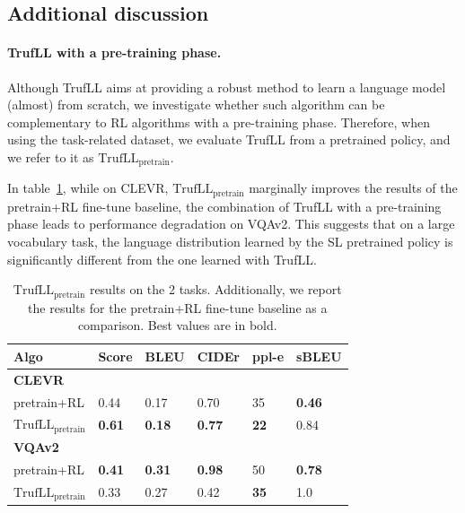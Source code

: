 \documentclass{article}
\newcommand{\algo}{TrufLL\xspace}
\begin{document}
\subsection{Additional discussion}
\label{app:subsec:discussion}
\paragraph{\algo with a pre-training phase.}
\label{sec:app:pretrain}
Although \algo aims at providing a robust method to learn a language model (almost) from scratch, we investigate whether such algorithm can be complementary to RL algorithms with a pre-training phase. Therefore, when using the task-related dataset, we evaluate \algo from a pretrained policy, and we refer to it as $\mathrm{\algo}_{\mathrm{pretrain}}$.  

In table~\ref{table:abl:truffl_pretrain}, while on CLEVR, $\mathrm{\algo}_{\mathrm{pretrain}}$ marginally improves the results of the pretrain+RL fine-tune baseline, the combination of \algo with a pre-training phase leads to performance degradation on VQAv2. This suggests that on a large vocabulary task, the language distribution learned by the SL pretrained policy is significantly different from the one learned with \algo. 

\begin{table}[h!]
\caption{\small $\mathrm{\algo}_{\mathrm{pretrain}}$ results on the 2 tasks. Additionally, we report the results for the pretrain+RL fine-tune baseline as a comparison. Best values are in bold.}
\label{table:abl:truffl_pretrain}
\small
\centering
\begin{tabular}{p{}|p{}|p{}p{}p{}|p{}}
Algo & Score & BLEU & CIDEr & ppl-e & sBLEU \\\toprule
\multicolumn{6}{l}{\textbf{CLEVR}}\\
\hline
pretrain+RL & 0.44 & 0.17 & 0.70 & 35 & \textbf{0.46} \\
$\mathrm{\algo}_{\mathrm{pretrain}}$ & \textbf{0.61} & \textbf{0.18} & \textbf{0.77} & \textbf{22} & 0.84 \\
\toprule
\multicolumn{6}{l}{\textbf{VQAv2}}  \\
\hline
pretrain+RL & \textbf{0.41} & \textbf{0.31} & \textbf{0.98} & 50 & \textbf{0.78} \\
$\mathrm{\algo}_{\mathrm{pretrain}}$ & 0.33 & 0.27 & 0.42 & \textbf{35} & 1.0 \\
\bottomrule
\end{tabular}
\end{table}
\end{document}
